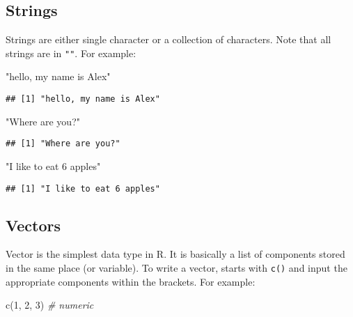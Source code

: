 \documentclass[
]{book}
\newenvironment{Shaded}{\begin{snugshade}}{\end{snugshade}}
\newcommand{\CommentTok}[1]{\textcolor[rgb]{0.56,0.35,0.01}{\textit{#1}}}
\newcommand{\DecValTok}[1]{\textcolor[rgb]{0.00,0.00,0.81}{#1}}
\newcommand{\FunctionTok}[1]{\textcolor[rgb]{0.00,0.00,0.00}{#1}}
\newcommand{\NormalTok}[1]{#1}
\newcommand{\StringTok}[1]{\textcolor[rgb]{0.31,0.60,0.02}{#1}}
\begin{document}
\hypertarget{strings}{%
\subsection{Strings}\label{strings}}

Strings are either single character or a collection of characters. Note that all strings are in \texttt{""}. For example:

\begin{Shaded}
\begin{Highlighting}[]
\StringTok{"hello, my name is Alex"}
\end{Highlighting}
\end{Shaded}

\begin{verbatim}
## [1] "hello, my name is Alex"
\end{verbatim}

\begin{Shaded}
\begin{Highlighting}[]
\StringTok{"Where are you?"}
\end{Highlighting}
\end{Shaded}

\begin{verbatim}
## [1] "Where are you?"
\end{verbatim}

\begin{Shaded}
\begin{Highlighting}[]
\StringTok{"I like to eat 6 apples"}
\end{Highlighting}
\end{Shaded}

\begin{verbatim}
## [1] "I like to eat 6 apples"
\end{verbatim}

\hypertarget{vectors}{%
\subsection{Vectors}\label{vectors}}

Vector is the simplest data type in R. It is basically a list of components stored in the same place (or variable). To write a vector, starts with \texttt{c()} and input the appropriate components within the brackets. For example:

\begin{Shaded}
\begin{Highlighting}[]
\FunctionTok{c}\NormalTok{(}\DecValTok{1}\NormalTok{, }\DecValTok{2}\NormalTok{, }\DecValTok{3}\NormalTok{) }\CommentTok{\# numeric}
\end{Highlighting}
\end{Shaded}
\end{document}
